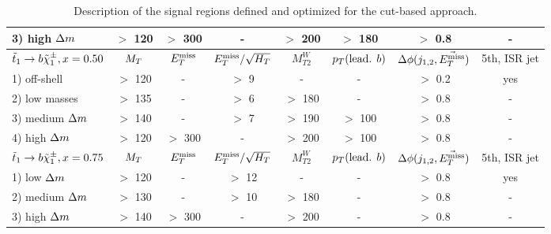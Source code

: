 \begin{table}[!ht]
{\begin{center}
\begin{tabular}{|l|ccccccc|}
    3) high   $\Delta m$ & $>$ 120   & $>$ 300  &     -           &  $>$ 200   & $>$ 180               &  $>$ 0.8      & -             \\
    \hline
    $\tilde{t}_1 \rightarrow b\tilde{\chi}_1^\pm, x=0.50$     & $M_T$     & $E_T^\text{miss}$    & $E_T^\text{miss}/\sqrt{H_T}$ & $M_{T2}^W$ & $p_T(\text{lead. }b)$ & $\Delta\phi(j_{1,2},\vec{E_T^\text{miss}})$ & 5th, ISR jet  \\
    \hline
    1) off-shell        &  $>$ 120  &   -      &  $>$  9         &    -       & -                     &  $>$ 0.2      & yes           \\
    2) low masses       &  $>$ 135  &   -      &  $>$  6         & $>$ 180    & -                     &  $>$ 0.8      & -             \\
    3) medium $\Delta m$ &  $>$ 140  &   -      &  $>$  7         & $>$ 190    & $>$ 100               &  $>$ 0.8      & -             \\
    4) high   $\Delta m$ &  $>$ 120  & $>$ 300  &   -             & $>$ 200    & $>$ 100               &  $>$ 0.8      & -             \\
    \hline
    $\tilde{t}_1 \rightarrow b\tilde{\chi}_1^\pm, x=0.75$   & $M_T$     & $E_T^\text{miss}$    & $E_T^\text{miss}/\sqrt{H_T}$ & $M_{T2}^W$ & $p_T(\text{lead. }b)$ & $\Delta\phi(j_{1,2},\vec{E_T^\text{miss}})$ & 5th, ISR jet  \\
    \hline
    1) low    $\Delta m$ &  $>$ 120  &   -      &  $>$  12        &     -      &      -                &  $>$ 0.8      & yes           \\
    2) medium $\Delta m$ &  $>$ 130  &   -      &  $>$  10        &  $>$ 180   &      -                &  $>$ 0.8      & -             \\
    3) high   $\Delta m$ &  $>$ 140  & $>$ 300  &    -            &  $>$ 200   &      -                &  $>$ 0.8      & -             \\
    \hline
    \end{tabular}
\caption{Description of the signal regions defined and optimized for the cut-based approach. \label{tab:cutAndCountCuts}}
\end{center}}
\end{table}


